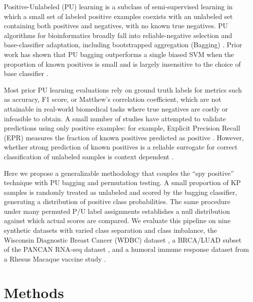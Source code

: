 \documentclass[11pt]{article}
\begin{document}
Positive-Unlabeled (PU) learning is a subclass of semi-supervised learning in which a small set of labeled positive examples coexists with an unlabeled set containing both positives and negatives, with no known true negatives. PU algorithms for bioinformatics broadly fall into reliable-negative selection and base-classifier adaptation, including bootstrapped aggregation (Bagging) \cite{li2014pu,mordelet2014bagging}. Prior work has shown that PU bagging outperforms a single biased SVM when the proportion of known positives is small and is largely insensitive to the choice of base classifier \cite{mordelet2014bagging}.

Most prior PU learning evaluations rely on ground truth labels for metrics such as accuracy, F1 score, or Matthew's correlation coefficient, which are not attainable in real-world biomedical tasks where true negatives are costly or infeasible to obtain. A small number of studies have attempted to validate predictions using only positive examples: for example, Explicit Precision Recall (EPR) measures the fraction of known positives predicted as positive \cite{cheng2017pu}. However, whether strong prediction of known positives is a reliable surrogate for correct classification of unlabeled samples is context dependent \cite{bekker2020learning}.

Here we propose a generalizable methodology that couples the ``spy positive'' technique \cite{liu2003building} with PU bagging \cite{mordelet2014bagging} and permutation testing. A small proportion of KP samples is randomly treated as unlabeled and scored by the bagging classifier, generating a distribution of positive class probabilities. The same procedure under many permuted P/U label assignments establishes a null distribution against which actual scores are compared. We evaluate this pipeline on nine synthetic datasets with varied class separation and class imbalance, the Wisconsin Diagnostic Breast Cancer (WDBC) dataset \cite{street1993wdbc}, a BRCA/LUAD subset of the PANCAN RNA-seq dataset \cite{weinstein2013pancan}, and a humoral immune response dataset from a Rhesus Macaque vaccine study \cite{lakhashe2019humoral}.

\section{Methods}
\end{document}
